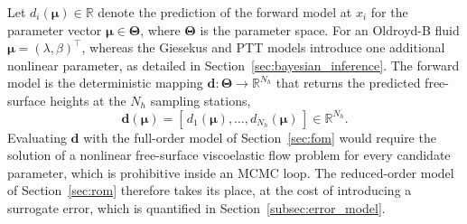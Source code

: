 \documentclass{elsarticle}
\renewcommand{\vec}[1]{\boldsymbol{#1}}
\newcommand{\params}{\boldsymbol{\mu}}
\newcommand{\paramspace}{\boldsymbol{\Theta}}
\begin{document}
Let ${d}_{i}(\params) \in \mathbb{R}$ denote the prediction of the forward
model at $x_{i}$ for the parameter vector $\params \in \paramspace$, where
$\paramspace$ is the parameter space. For an Oldroyd-B fluid
$\params=(\lambda,\beta)^{\top}$, whereas the Giesekus and PTT models introduce
one additional nonlinear parameter, as detailed in
Section~\ref{sec:bayesian_inference}. The forward model is the deterministic
mapping $\vec{d}: \paramspace \to \mathbb{R}^{N_h}$ that returns the predicted
free-surface heights at the $N_h$ sampling stations,
\begin{equation}
\vec{d}(\params)
=
[\,{d}_{1}(\params),\dots,{d}_{N_h}(\params)\,] \in \mathbb{R}^{N_h}.
\label{eq:forward_model}
\end{equation}
Evaluating $\vec{d}$ with the full-order model of Section~\ref{sec:fom} would
require the solution of a nonlinear free-surface viscoelastic flow problem for
every candidate parameter, which is prohibitive inside an MCMC loop. The
reduced-order model of Section~\ref{sec:rom} therefore takes its place, at the
cost of introducing a surrogate error, which is quantified in
Section~\ref{subsec:error_model}.
\end{document}
